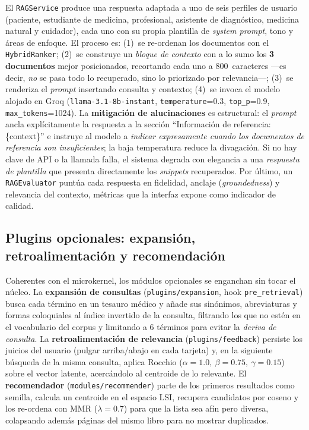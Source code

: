 \documentclass[runningheads,a4paper,14pts]{llncs}
\begin{document}
	El \texttt{RAGService} produce una respuesta adaptada a uno de seis perfiles de
	usuario (paciente, estudiante de medicina, profesional, asistente de diagnóstico,
	medicina natural y cuidador), cada uno con su propia plantilla de \emph{system
		prompt}, tono y áreas de enfoque. El proceso es: (1)~se re-ordenan los documentos
	con el \texttt{HybridRanker}; (2)~se construye un \emph{bloque de contexto} con a
	lo sumo los \textbf{3 documentos} mejor posicionados, recortando cada uno a
	800~caracteres ---es decir, \emph{no} se pasa todo lo recuperado, sino lo
	priorizado por relevancia---; (3)~se renderiza el \emph{prompt} insertando
	consulta y contexto; (4)~se invoca el modelo alojado en Groq
	(\texttt{llama-3.1-8b-instant}, \texttt{temperature}=0.3, \texttt{top\_p}=0.9,
	\texttt{max\_tokens}=1024). La \textbf{mitigación de alucinaciones} es
	estructural: el \emph{prompt} ancla explícitamente la respuesta a la sección
	``Información de referencia: \{context\}'' e instruye al modelo a \emph{indicar
		expresamente cuando los documentos de referencia son insuficientes}; la baja
	temperatura reduce la divagación. Si no hay clave de API o la llamada falla, el
	sistema degrada con elegancia a una \emph{respuesta de plantilla} que presenta
	directamente los \emph{snippets} recuperados. Por último, un \texttt{RAGEvaluator}
	puntúa cada respuesta en fidelidad, anclaje (\emph{groundedness}) y relevancia del
	contexto, métricas que la interfaz expone como indicador de calidad.
	
	\subsection{Plugins opcionales: expansión, retroalimentación y recomendación}
	
	Coherentes con el microkernel, los módulos opcionales se enganchan sin tocar el
	núcleo. La \textbf{expansión de consultas} (\texttt{plugins/expansion}, hook
	\texttt{pre\_retrieval}) busca cada término en un tesauro médico y añade sus
	sinónimos, abreviaturas y formas coloquiales al índice invertido de la consulta,
	filtrando los que no estén en el vocabulario del corpus y limitando a 6 términos
	para evitar la \emph{deriva de consulta}. La \textbf{retroalimentación de
		relevancia} (\texttt{plugins/feedback}) persiste los juicios del usuario
	(pulgar arriba/abajo en cada tarjeta) y, en la siguiente búsqueda de la misma
	consulta, aplica Rocchio (\(\alpha=1.0,\ \beta=0.75,\ \gamma=0.15\)) sobre el
	vector latente, acercándolo al centroide de lo relevante. El \textbf{recomendador}
	(\texttt{modules/recommender}) parte de los primeros resultados como semilla,
	calcula un centroide en el espacio LSI, recupera candidatos por coseno y los
	re-ordena con MMR ($\lambda=0.7$) para que la lista sea afín pero diversa,
	colapsando además páginas del mismo libro para no mostrar duplicados.
	
\end{document}
